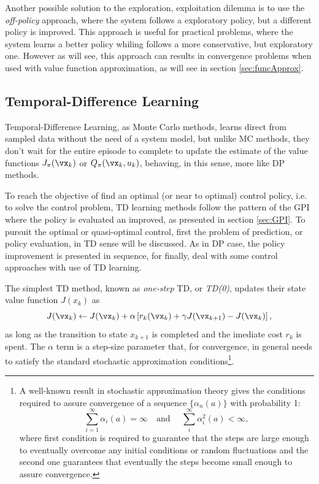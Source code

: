 Another possible solution to the exploration, exploitation dilemma is to use the \textit{off-policy} approach, where the system follows a exploratory policy, but a different policy is improved. This approach is useful for practical problems, where the system learns a better policy whiling follows a more conservative, but exploratory one. However as will see, this approach can results in convergence problems when used with value function approximation, as will see in section \eqref{sec:funcApprox}.

\subsection{Temporal-Difference Learning}
\label{sec:TDlearning}

Temporal-Difference Learning, as Monte Carlo methods, learns direct from sampled data without the need of a system model, but unlike MC methods, they don't wait for the entire episode to complete to update the estimate of the value functions $J_\pi(\vx_k)$  or  $Q_\pi(\vx_k,u_k)$, behaving, in this sense, more like DP methods. 

To reach the objective of find an optimal (or near to optimal) control policy, i.e. to solve the control problem, TD learning methods follow the pattern of the GPI where the policy is evaluated an improved, as presented in section 
\ref{sec:GPI}. 
To pursuit the optimal or quasi-optimal control, first the problem of prediction, or policy evaluation, in TD sense will be discussed. As in DP case, the policy improvement is presented in sequence, for finally, deal with some control approaches with use of TD learning.

The simplest TD method, known as \textit{one-step} TD, or \textit{TD(0)}, updates their state value function $J(x_k)$ as
\begin{equation}
  J(\vx_k) \gets J(\vx_k) + \alpha\left[r_k(\vx_k) + \gamma J(\vx_{k+1}) - J(\vx_k)\right]
\label{eq:TDupdate},
\end{equation}
as long as the transition to state $x_{k+1}$ is completed and the imediate cost $r_k$ is spent.
The $\alpha$ term is a step-size parameter that, for convergence, in general needs to satisfy the standard stochastic approximation conditions\footnote
{ 
  A well-known result in stochastic approximation theory gives the conditions required to assure convergence of a sequence $\{\alpha_n(a)\}$ with probability 1:
  \begin{equation}
      \sum_{i=1}^\infty \alpha_i(a) = \infty \quad \text{and } \quad \sum_{i}^\infty \alpha_i^2(a) < \infty
    \label{eq:stochAppTeor},
  \end{equation}
  where first condition is required to guarantee that the steps are large enough to eventually
  overcome any initial conditions or random fluctuations and the second one guarantees
  that eventually the steps become small enough to assure convergence.
}.


